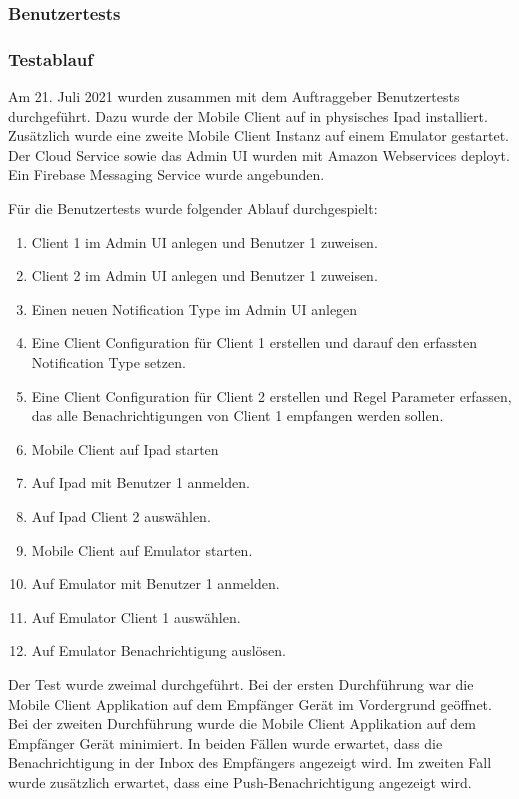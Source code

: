 \subsubsection*{Benutzertests}

\subsubsection*{Testablauf}

Am 21. Juli 2021 wurden zusammen mit dem Auftraggeber Benutzertests durchgeführt.
Dazu wurde der Mobile Client auf in physisches Ipad installiert.
Zusätzlich wurde eine zweite Mobile Client Instanz auf einem Emulator gestartet.
Der Cloud Service sowie das Admin UI wurden mit Amazon Webservices deployt.
Ein Firebase Messaging Service wurde angebunden.

Für die Benutzertests wurde folgender Ablauf durchgespielt:

\begin{enumerate}
    \item Client 1 im Admin UI anlegen und Benutzer 1 zuweisen.
    \item Client 2 im Admin UI anlegen und Benutzer 1 zuweisen.
    \item Einen neuen Notification Type im Admin UI anlegen
    \item Eine Client Configuration für Client 1 erstellen und darauf den erfassten Notification Type setzen.
    \item Eine Client Configuration für Client 2 erstellen und Regel Parameter erfassen, das alle Benachrichtigungen von Client 1 empfangen werden sollen.
    \item Mobile Client auf Ipad starten
    \item Auf Ipad mit Benutzer 1 anmelden.
    \item Auf Ipad Client 2 auswählen.
    \item Mobile Client auf Emulator starten.
    \item Auf Emulator mit Benutzer 1 anmelden.
    \item Auf Emulator Client 1 auswählen.
    \item Auf Emulator Benachrichtigung auslösen.
\end{enumerate}

Der Test wurde zweimal durchgeführt.
Bei der ersten Durchführung war die Mobile Client Applikation auf dem Empfänger Gerät im Vordergrund geöffnet.
Bei der zweiten Durchführung wurde die Mobile Client Applikation auf dem Empfänger Gerät minimiert.
In beiden Fällen wurde erwartet, dass die Benachrichtigung in der Inbox des Empfängers angezeigt wird.
Im zweiten Fall wurde zusätzlich erwartet, dass eine Push-Benachrichtigung angezeigt wird.

